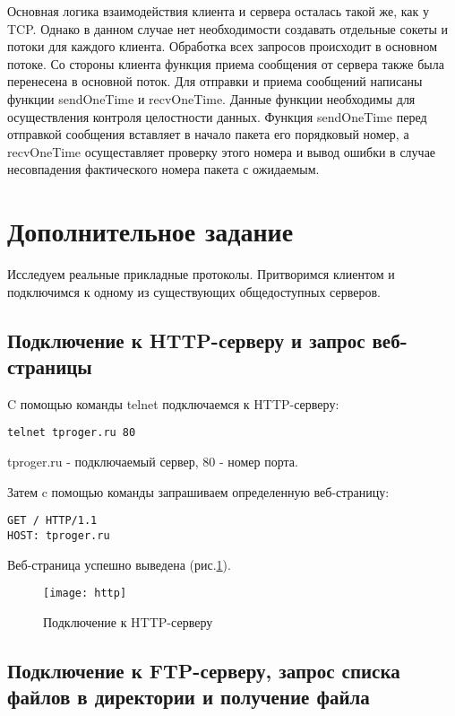 Основная логика взаимодействия клиента и сервера осталась такой же, как у TCP. Однако в данном случае нет необходимости создавать отдельные сокеты и потоки для каждого клиента. Обработка всех запросов происходит в основном потоке. Со стороны клиента функция приема сообщения от сервера также была перенесена в основной поток. Для отправки и приема сообщений написаны функции sendOneTime и recvOneTime. Данные функции необходимы для осуществления контроля целостности данных. Функция sendOneTime перед отправкой сообщения вставляет в начало пакета его порядковый номер, а recvOneTime осущеставляет проверку этого номера и вывод ошибки в случае несовпадения фактического номера пакета с ожидаемым. 

\section{Дополнительное задание}

Исследуем реальные прикладные протоколы. Притворимся клиентом и подключимся к одному из существующих общедоступных серверов. 

\subsection{Подключение к HTTP-серверу и запрос веб-страницы}

C помощью команды telnet подключаемся к HTTP-серверу:

\begin{lstlisting}
telnet tproger.ru 80
\end{lstlisting}

tproger.ru - подключаемый сервер, 80 - номер порта.

Затем c помощью команды запрашиваем определенную веб-страницу:

\begin{lstlisting}
GET / HTTP/1.1
HOST: tproger.ru
\end{lstlisting}

Веб-страница успешно выведена (рис.\ref{pic:http}).

\begin{figure}[H]
	\begin{center}
		\texttt{[image: http]}
		\caption{Подключение к HTTP-серверу} 
		\label{pic:http} %
	\end{center}
\end{figure}

\subsection{Подключение к FTP-серверу, запрос списка файлов в директории и получение файла}



